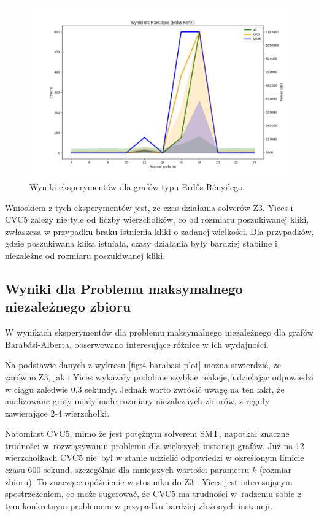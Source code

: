 \begin{figure}[htbp]
	\centering
	\begin{minipage}{\textwidth}
		\includegraphics[width=\textwidth]{./figures/3-erdos-renyi-plot.png}
		\caption{Wyniki eksperymentów dla grafów typu Erdős-Rényi'ego.}
		\label{fig:3-erdos-renyi-plot}
	\end{minipage}
\end{figure}

Wnioskiem z tych eksperymentów jest, że czas działania solverów Z3, Yices i CVC5 zależy nie tyle od liczby wierzchołków, co od rozmiaru poszukiwanej kliki, zwłaszcza w przypadku braku istnienia kliki o zadanej wielkości. Dla przypadków, gdzie poszukiwana klika istniała, czasy działania były bardziej stabilne i niezależne od rozmiaru poszukiwanej kliki.


\subsection{Wyniki dla Problemu maksymalnego niezależnego zbioru}

W wynikach eksperymentów dla problemu maksymalnego niezależnego dla grafów Barabási-Alberta, obserwowano interesujące różnice w ich wydajności.

Na podstawie danych z wykresu \ref{fig:4-barabasi-plot} można stwierdzić, że zarówno Z3, jak i Yices wykazały podobnie szybkie reakcje, udzielając odpowiedzi w ciągu zaledwie 0.3 sekundy. Jednak warto zwrócić uwagę na ten fakt, że analizowane grafy miały małe rozmiary niezależnych zbiorów, z reguły zawierające 2-4 wierzchołki.

Natomiast CVC5, mimo że jest potężnym solverem SMT, napotkał znaczne trudności w~rozwiązywaniu problemu dla większych instancji grafów. Już na 12 wierzchołkach CVC5 nie~był w stanie udzielić odpowiedzi w określonym limicie czasu 600 sekund, szczególnie dla mniejszych wartości parametru $k$ (rozmiar zbioru). To znaczące opóźnienie w stosunku do Z3 i Yices jest interesującym spostrzeżeniem, co może sugerować, że CVC5 ma trudności w~radzeniu sobie z tym konkretnym problemem w przypadku bardziej złożonych instancji.

